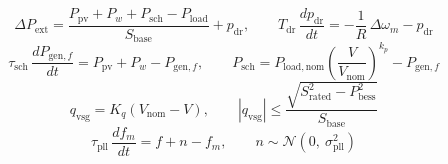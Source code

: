 \documentclass[11pt]{article}
\begin{document}
\begin{equation}
\Delta P_{\mathrm{ext}} = \frac{P_{\mathrm{pv}} + P_w + P_{\mathrm{sch}} - P_{\mathrm{load}}}{S_{\mathrm{base}}} + p_{\mathrm{dr}}, \qquad T_{\mathrm{dr}}\,\frac{dp_{\mathrm{dr}}}{dt} = -\frac{1}{R}\,\Delta\omega_m - p_{\mathrm{dr}} \tag{3.8}
\end{equation}
\begin{equation}
\tau_{\mathrm{sch}}\,\frac{dP_{\mathrm{gen},f}}{dt} = P_{\mathrm{pv}} + P_w - P_{\mathrm{gen},f}, \qquad P_{\mathrm{sch}} = P_{\mathrm{load,nom}}\left(\frac{V}{V_{\mathrm{nom}}}\right)^{k_p} - P_{\mathrm{gen},f} \tag{3.9}
\end{equation}
\begin{equation}
q_{\mathrm{vsg}} = K_q\left(V_{\mathrm{nom}} - V\right), \qquad \left|q_{\mathrm{vsg}}\right| \le \frac{\sqrt{S_{\mathrm{rated}}^{2} - P_{\mathrm{bess}}^{2}}}{S_{\mathrm{base}}} \tag{3.10}
\end{equation}
\begin{equation}
\tau_{\mathrm{pll}}\,\frac{df_m}{dt} = f + n - f_m, \qquad n \sim \mathcal{N}\!\left(0,\ \sigma_{\mathrm{pll}}^{2}\right) \tag{3.11}
\end{equation}
\end{document}

